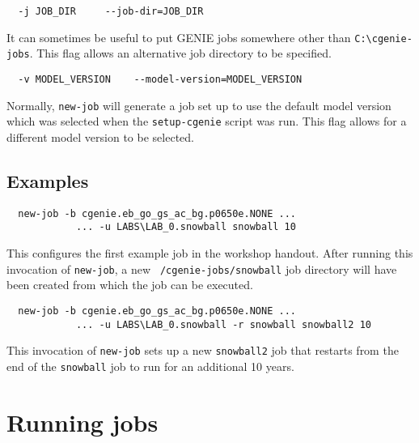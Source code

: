 \documentclass[a4paper,10pt,article]{memoir}
\begin{document}
\begin{verbatim}
  -j JOB_DIR     --job-dir=JOB_DIR
\end{verbatim}
It can sometimes be useful to put GENIE jobs somewhere other than
\texttt{C:\textbackslash{}cgenie-jobs}.  This flag allows an
alternative job directory to be specified.

\begin{verbatim}
  -v MODEL_VERSION    --model-version=MODEL_VERSION
\end{verbatim}
Normally, \texttt{new-job} will generate a job set up to use the
default model version which was selected when the
\texttt{setup-cgenie} script was run.  This flag allows for a
different model version to be selected.

\subsection*{Examples}

\begin{verbatim}
  new-job -b cgenie.eb_go_gs_ac_bg.p0650e.NONE ...
            ... -u LABS\LAB_0.snowball snowball 10
\end{verbatim}
This configures the first example job in the workshop handout.  After
running this invocation of \texttt{new-job}, a new
\texttt{~/cgenie-jobs/snowball} job directory will have been created
from which the job can be executed.

\begin{verbatim}
  new-job -b cgenie.eb_go_gs_ac_bg.p0650e.NONE ...
            ... -u LABS\LAB_0.snowball -r snowball snowball2 10
\end{verbatim}
This invocation of \texttt{new-job} sets up a new \texttt{snowball2}
job that restarts from the end of the \texttt{snowball} job to run for
an additional 10 years.

\section{Running jobs}
\end{document}
